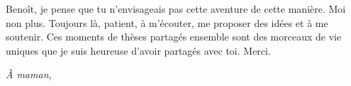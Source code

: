 Benoît, je pense que tu n'envisageais pas cette aventure de cette manière. Moi 
non plus. Toujours là, 
patient, à m'écouter, me proposer des idées et à me soutenir. Ces 
moments de thèses partagés ensemble sont des morceaux de vie uniques que je 
suis heureuse d'avoir partagés avec toi. Merci.
\clearpage
\pagebreak

\thispagestyle{empty}
\begin{flushright}
\textit{À maman,}
\end{flushright}

\pagebreak
